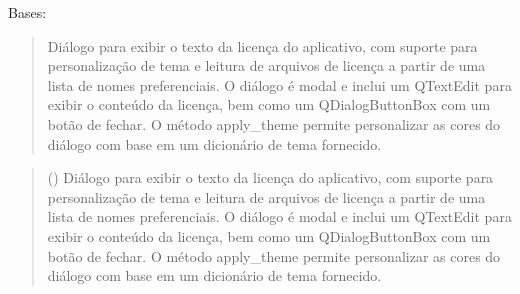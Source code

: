 \documentclass[letterpaper,10pt,english]{sphinxmanual}
\begin{document}

\begin{fulllineitems}
\label{\detokenize{api/license_dialog:license_dialog.LicenseDialog}}
\pysigstartsignatures
\pysiglinewithargsret
{}
{\sphinxparamcomma {}\sphinxparamcomma {}}
{}
\pysigstopsignatures
\sphinxAtStartPar
Bases: 
\begin{quote}

\sphinxAtStartPar
Diálogo para exibir o texto da licença do aplicativo, com suporte para personalização de tema e leitura de arquivos de licença a partir de uma lista de nomes preferenciais. O diálogo é modal e inclui um QTextEdit para exibir o conteúdo da licença, bem como um QDialogButtonBox com um botão de fechar. O método apply\_theme permite personalizar as cores do diálogo com base em um dicionário de tema fornecido.
\end{quote}
\begin{quote}\begin{description}
\sphinxAtStartPar
{} () \textendash{} Diálogo para exibir o texto da licença do aplicativo, com suporte para personalização de tema e leitura de arquivos de licença a partir de uma lista de nomes preferenciais. O diálogo é modal e inclui um QTextEdit para exibir o conteúdo da licença, bem como um QDialogButtonBox com um botão de fechar. O método apply\_theme permite personalizar as cores do diálogo com base em um dicionário de tema fornecido.

\end{description}\end{quote}


\end{fulllineitems}
\end{document}
